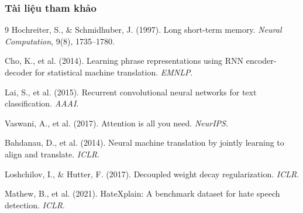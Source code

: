 \documentclass[serif, aspectratio=169]{beamer}
\begin{document}
\begin{frame}[t, allowframebreaks]
\frametitle{Tài liệu tham khảo}
\begin{thebibliography}{9}
Hochreiter, S., \& Schmidhuber, J. (1997). Long short-term memory. \textit{Neural Computation}, 9(8), 1735--1780.

Cho, K., et al. (2014). Learning phrase representations using RNN encoder-decoder for statistical machine translation. \textit{EMNLP}.

Lai, S., et al. (2015). Recurrent convolutional neural networks for text classification. \textit{AAAI}.

Vaswani, A., et al. (2017). Attention is all you need. \textit{NeurIPS}.

Bahdanau, D., et al. (2014). Neural machine translation by jointly learning to align and translate. \textit{ICLR}.

Loshchilov, I., \& Hutter, F. (2017). Decoupled weight decay regularization. \textit{ICLR}.

Mathew, B., et al. (2021). HateXplain: A benchmark dataset for hate speech detection. \textit{ICLR}.
\end{thebibliography}
\end{frame}
\end{document}
